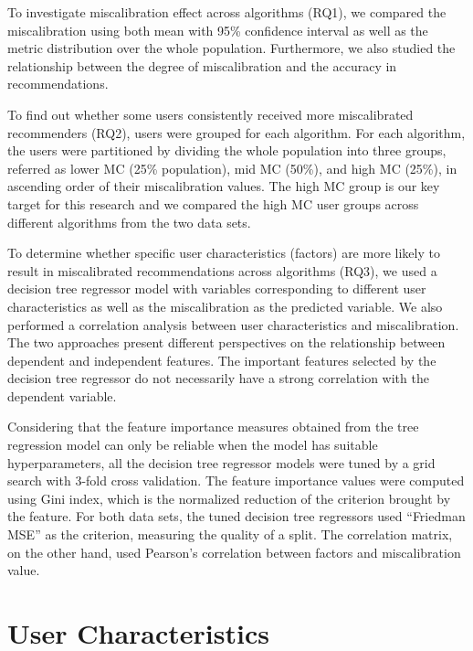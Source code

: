 To investigate miscalibration effect across algorithms (RQ1), we compared the miscalibration using both mean with 95\% confidence interval as well as the metric distribution over the whole population. Furthermore, we also studied the relationship between the degree of miscalibration and the accuracy in recommendations. 

To find out whether some users consistently received more miscalibrated recommenders (RQ2), users were grouped for each algorithm. For each algorithm, the users were partitioned by dividing the whole population into three groups, referred as lower MC (25\% population), mid MC (50\%), and high MC (25\%), in ascending order of their miscalibration values. The high MC group is our key target for this research and we compared the high MC user groups across different algorithms from the two data sets. 

To determine whether specific user characteristics (factors) are more likely to result in miscalibrated recommendations across algorithms (RQ3), we used a decision tree regressor model with variables corresponding to different user characteristics as well as the miscalibration as the predicted variable. We also performed a correlation analysis between user characteristics and miscalibration. The two approaches present different perspectives on the relationship between dependent and independent features. The important features selected by the decision tree regressor do not necessarily have a strong correlation with the dependent variable. 


Considering that the feature importance measures obtained from the tree regression model can only be reliable when the model has suitable hyperparameters, all the decision tree regressor models were tuned by a grid search with 3-fold cross validation. The feature importance values were computed using Gini index, which is the normalized reduction of the criterion brought by the feature. For both data sets, the tuned decision tree regressors used ``Friedman MSE'' \cite{friedman2001elements} as the criterion, measuring the quality of a split. The correlation matrix, on the other hand, used Pearson's correlation between factors and miscalibration value.

\section{User Characteristics} 

